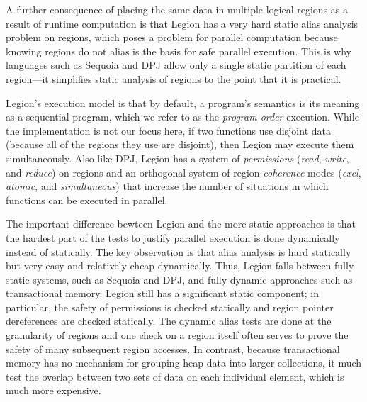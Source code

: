 A further consequence of placing the same data in multiple logical
regions as a result of runtime computation is that Legion has a very
hard static alias analysis problem on regions, which poses a problem
for parallel computation because knowing regions do not alias is the
basis for safe parallel execution.  This is why languages such as
Sequoia and DPJ allow only a single static partition of each
region---it simplifies static analysis of regions to the point that it
is practical.  

Legion's execution model is that by default, a program's semantics is
its meaning as a sequential program, which we refer to as the {\em
program order} execution.  While the
implementation is not our focus here, if two functions use
disjoint data (because all of the regions they use are disjoint), then
Legion may execute them simultaneously.  Also like DPJ,
Legion has a system of {\em permissions} ({\em read}, {\em write}, and
{\em reduce}) on regions and an orthogonal system of region {\em
coherence} modes ({\em excl}, {\em atomic}, and {\em simultaneous})
that increase the number of situations in which functions can be
executed in parallel.

The important difference bewteen Legion and the more static approaches
is that the hardest part of the tests to justify parallel execution is
done dynamically instead of statically.  The key observation is that
alias analysis is hard statically but very easy and relatively cheap
dynamically.  Thus, Legion falls between fully static systems, such as
Sequoia and DPJ, and fully dynamic approaches such as transactional
memory.  Legion still has a significant static component; in
particular, the safety of permissions is checked statically and region
pointer dereferences are checked statically.  The dynamic alias tests
are done at the granularity of regions and one check on a region
itself often serves to prove the safety of many subsequent region
accesses.  In contrast, because transactional memory has no mechanism
for grouping heap data into larger collections, it much test the
overlap between two sets of data on each individual element, which is
much more expensive.


